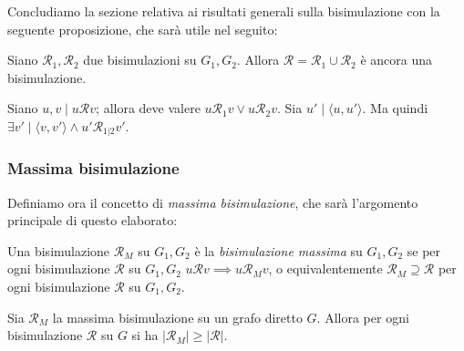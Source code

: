 Concludiamo la sezione relativa ai risultati generali sulla bisimulazione con la seguente proposizione, che sarà utile nel seguito:
\begin{proposition}
    Siano $\mathcal{R}_1, \mathcal{R}_2$ due bisimulazioni su $G_1, G_2$. Allora $\mathcal{R} = \mathcal{R}_1 \cup \mathcal{R}_2$ è ancora una bisimulazione.
    \label{obs:bisimulation_union}
\end{proposition}
\begin{proof2}
    Siano $u,v \mid u \mathcal{R} v$; allora deve valere $u \mathcal{R}_1 v \lor u \mathcal{R}_2 v$. Sia $u' \mid \langle u, u' \rangle$. Ma quindi $\exists v' \mid \langle v,v' \rangle \land u' \mathcal{R}_{1|2} v'$.
\end{proof2}

\subsubsection{Massima bisimulazione}
\label{sec:bisi_max}
Definiamo ora il concetto di \emph{massima bisimulazione}, che sarà l'argomento principale di questo elaborato:
\begin{definition}
    Una bisimulazione $\mathcal{R}_M$ su $G_1, G_2$ è la \emph{bisimulazione massima} su $G_1, G_2$ se per ogni bisimulazione $\mathcal{R}$ su $G_1,G_2 \,\, u \mathcal{R} v \implies u \mathcal{R}_M v$, o equivalentemente $\mathcal{R}_M \supseteq \mathcal{R}$ per ogni bisimulazione $\mathcal{R}$ su $G_1, G_2$.
\end{definition}

\begin{observation}
    Sia $\mathcal{R}_M$ la massima bisimulazione su un grafo diretto $G$. Allora per ogni bisimulazione $\mathcal{R}$ su $G$ si ha $|\mathcal{R}_M| \geq |\mathcal{R}|$.
\end{observation}

